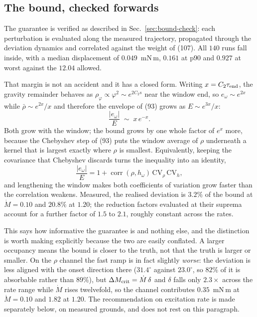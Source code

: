 \documentclass[10pt]{article}
\newcommand{\Mdot}{\dot M}
\newcommand{\rbar}{\bar\rho}
\begin{document}
\subsection{The bound, checked forwards}

The guarantee is verified as described in
Sec.~\ref{sec:bound-check}: each perturbation is evaluated along the
measured trajectory, propagated through the deviation dynamics and
correlated against the weight of (107). All $140$ runs fall inside,
with a median displacement of $0.049$~mN\,m, $0.161$ at p90 and $0.927$
at worst against the $12.04$ allowed.

That margin is not an accident and it has a closed form. Writing
$x = C_2\tau_{\rm end}$, the gravity remainder behaves as
$\rho_\varphi\propto\varphi^2\sim e^{2C_2 s}$ near the window end, so
$e_\omega\sim e^{2x}$ while $\rbar\sim e^{2x}/x$ and therefore the
envelope of (93) grows as $E\sim e^{3x}/x$:
\begin{equation}
  \frac{|e_\omega|}{E}\;\sim\;x\,e^{-x} .
  \tag{VIII.1}
\end{equation}
Both grow with the window; the bound grows by one whole factor of
$e^{x}$ more, because the Chebyshev step of (93) puts the window average
of $\rho$ underneath a kernel that is largest exactly where $\rho$ is
smallest. Equivalently, keeping the covariance that Chebyshev discards
turns the inequality into an identity,
\begin{equation}
  \frac{|e_\omega|}{E}
   = 1 + \operatorname{corr}(\rho,h_\omega)\,
         \mathrm{CV}_\rho\,\mathrm{CV}_{h} ,
  \tag{VIII.2}
\end{equation}
and lengthening the window makes both coefficients of variation grow
faster than the correlation weakens. Measured, the realised deviation is
$3.2\%$ of the bound at $\Mdot = 0.10$ and $20.8\%$ at $1.20$; the
reduction factors evaluated at their suprema account for a further
factor of $1.5$ to $2.1$, roughly constant across the rates.

This says how informative the guarantee is and nothing else, and the
distinction is worth making explicitly because the two are easily
conflated. A larger occupancy means the bound is closer to the truth,
not that the truth is larger or smaller. On the $\rho$ channel the fast
ramp is in fact slightly \emph{worse}: the deviation is less aligned
with the onset direction there ($31.4^\circ$ against $23.0^\circ$, so
$82\%$ of it is absorbable rather than $89\%$), but
$\Delta M_{\rm crit} = \Mdot\,\delta$ and $\delta$ falls only
$2.3\times$ across the rate range while $\Mdot$ rises twelvefold, so the
channel contributes $0.35$~mN\,m at $\Mdot = 0.10$ and $1.82$ at
$1.20$. The recommendation on excitation rate is made separately below,
on measured grounds, and does not rest on this paragraph.
\end{document}
